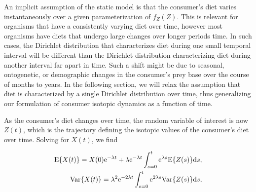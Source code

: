 \documentclass{frontiersSCNS}
\begin{document}






An implicit assumption of the static model is that the consumer's diet varies instantaneously over a given parameterization of $f_Z(Z)$.
This is relevant for organisms that have a consistently varying diet over time, however most organisms have diets that undergo large changes over longer periods time.
In such cases, the Dirichlet distribution that characterizes diet during one small temporal interval will be different than the Dirichlet distribution characterizing diet during another interval far apart in time.
Such a shift might be due to seasonal, ontogenetic, or demographic changes in the consumer's prey base over the course of months to years.
In the following section, we will relax the assumption that diet is characterized by a single Dirichlet distribution over time, thus generalizing our formulation of consumer isotopic dynamics as a function of time.

As the consumer's diet changes over time, the random variable of interest is now $Z(t)$, which is the trajectory defining the isotopic values of the consumer's diet over time.
Solving for $X(t)$, we find

\begin{align}
  \label{eqEVarZt}
{\rm E}\{X(t)\} = X(0){\rm e}^{-\lambda t} + \lambda{\rm e}^{-\lambda t} \int_{s=0}^t {\rm e}^{\lambda s} {\rm E}\{Z(s)\}{\rm d}s, \nonumber \\
{\rm Var}\{X(t)\} = \lambda^2 {\rm e}^{-2\lambda t} \int_{s=0}^t {\rm e}^{2\lambda s} {\rm Var}\{Z(s)\} {\rm d}s,
\end{align}
\end{document}
